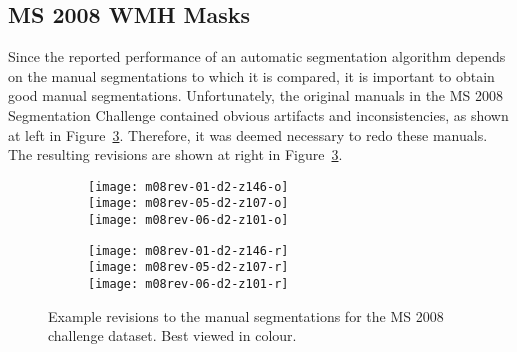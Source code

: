 \subsection{MS 2008 WMH Masks}\label{ss:m08-rev}
Since the reported performance of an automatic segmentation algorithm depends on
the manual segmentations to which it is compared,
it is important to obtain good manual segmentations.
Unfortunately, the original manuals in the MS 2008 Segmentation Challenge
contained obvious artifacts and inconsistencies,
as shown at left in Figure~\ref{fig:m08-rev}.
Therefore, it was deemed necessary to redo these manuals.
The resulting revisions are shown at right in Figure~\ref{fig:m08-rev}.
\begin{figure}
  \centering
  \begin{minipage}{6cm}
    \begin{subfigure}{\textwidth}
      \centering{}%
      \label{fig:m08-rev-o}
      \texttt{[image: m08rev-01-d2-z146-o]}\\[0.2em]
      \texttt{[image: m08rev-05-d2-z107-o]}\\[0.2em]
      \texttt{[image: m08rev-06-d2-z101-o]}
    \end{subfigure}
  \end{minipage}
  \begin{minipage}{6cm}
    \begin{subfigure}{\textwidth}
      \centering{}%
      \label{fig:m08-rev-r}
      \texttt{[image: m08rev-01-d2-z146-r]}%
      \makebox[0pt][r]{\textcolor{white}{\raisebox{0.5em}{ CHB 01 }}}\\[0.2em]
      \texttt{[image: m08rev-05-d2-z107-r]}%
      \makebox[0pt][r]{\textcolor{white}{\raisebox{0.5em}{ CHB 05 }}}\\[0.2em]
      \texttt{[image: m08rev-06-d2-z101-r]}%
      \makebox[0pt][r]{\textcolor{white}{\raisebox{0.5em}{CHB 06 }}}
    \end{subfigure}
  \end{minipage}
  \caption{Example revisions to the manual segmentations for the MS 2008 challenge dataset.
  Best viewed in colour.}%
  \label{fig:m08-rev}
\end{figure}
